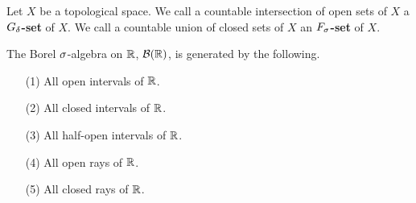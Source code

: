 \begin{definition}
    Let $X$ be a topological space. We call a countable intersection of open
    sets of  $X$ a \textbf{$G_\delta$-set} of $X$. We call a countable union of
    closed sets of $X$ an  \textbf{$F_\sigma$-set} of $X$.
\end{definition}

\begin{theorem}\label{8.1.5}
    The Borel $\sigma$-algebra on $\mathbb{R}$,  $\mathcal{B}(\mathbb{R})$, is generated by the following.
    \begin{enumerate}
        \item[(1)] All open intervals of $\mathbb{R}$.

        \item[(2)] All closed intervals of $\mathbb{R}$.

        \item[(3)] All half-open intervals of $\mathbb{R}$.

        \item[(4)] All open rays of $\mathbb{R}$.

        \item[(5)] All closed rays of $\mathbb{R}$.
    \end{enumerate}
\end{theorem}





